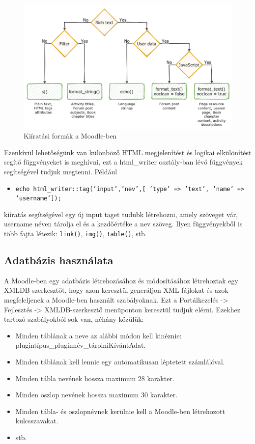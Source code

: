 \begin{figure}
    \centering
    \includegraphics[scale=0.9]{Fejezetek/Images/print.png}
    \caption{Kiíratási formák a Moodle-ben\cite{MoodleTutorial}}
\end{figure}

Ezenkívül lehetőségünk van különböző HTML megjelenítést és logikai elkülönítést segítő függvényeket is meghívni, ezt a html\_writer osztály-ban lévő függvények segítségével tudjuk megtenni. Például
\begin{itemize}
    \item[] \texttt{echo html\_writer::tag('input','nev',[ 'type' => 'text', 'name' => 'username']);} 
\end{itemize}
kiíratás segítségével egy új input taget tudubk létrehozni, amely szöveget vár, username néven tárolja el és a kezdőértéke a nev szöveg. Ilyen függvényekből is több fajta létezik: \texttt{link()}, \texttt{img()}, \texttt{table()}, stb.

\subsection{Adatbázis használata}

A Moodle-ben egy adatbázis létrehozásához és módosításához létrehoztak egy XMLDB szerkesztőt, hogy azon keresztül generáljon XML fájlokat és azok megfeleljenek a Moodle-ben használt szabályoknak. Ezt a Portálkezelés -> Fejlesztés -> XMLDB-szerkesztő menüponton keresztül tudjuk elérni. Ezekhez tartozó szabályokból sok van, néhány közülük:

\begin{itemize}
    \item Minden táblának a neve az alábbi módon kell kinéznie: \hfill \break plugintípus\_pluginnév\_tárolniKívántAdat.
    \item Minden táblának kell lennie egy automatikusan léptetett számlálóval.
    \item Minden tábla nevének hossza maximum 28 karakter.
    \item Minden oszlop nevének hossza maximum 30 karakter.
    \item Minden tábla- és oszlopnévnek kerülnie kell a Moodle-ben létrehozott kulcsszavakat.
    \item stb.
\end{itemize}

